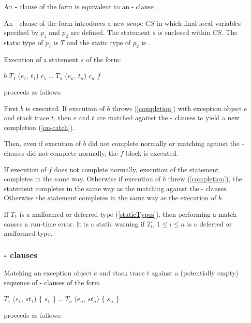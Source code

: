 \documentclass{article}
\begin{document}
An \ON{}-\CATCH{} clause of the form  is equivalent to an \ON{}-\CATCH{} clause .

\LMHash{}
An \ON{}-\CATCH{} clause of the form  introduces a new scope $CS$ in which final local variables specified by $p_1$ and $p_2$ are defined.
The statement $s$ is enclosed within $CS$.
The static type of $p_1$ is $T$ and the static type of $p_2$ is .

\LMHash{}
Execution of a \TRY{} statement $s$ of the form:
\begin{dartCode}
\TRY{} $b$
\ON{} $T_1$ \CATCH{} ($e_1$, $t_1$) $c_1$
\ldots{}
\ON{} $T_n$ \CATCH{} ($e_n$, $t_n$) $c_n$
\FINALLY{} $f$
\end{dartCode}
proceeds as follows:

\LMHash{}
First $b$ is executed.
If execution of $b$ throws (\ref{completion}) with exception object $e$ and stack trace $t$, then $e$ and $t$ are matched against the \ON{}-\CATCH{} clauses to yield a new completion (\ref{on-catch}).

Then, even if execution of $b$ did not complete normally or matching against the \ON{}-\CATCH{} clauses did not complete normally, the $f$ block is executed.

If execution of $f$ does not complete normally,
execution of the \TRY{} statement completes in the same way.
Otherwise if execution of $b$ threw (\ref{completion}), the \TRY{} statement completes in the same way as the matching against the \ON{}-\CATCH{} clauses.
Otherwise the \TRY{} statement completes in the same way as the execution of $b$.

\LMHash{}
If $T_1$ is a malformed or deferred type (\ref{staticTypes}), then performing a match causes a run-time error.
It is a static warning if $T_i$, $1 \le i \le n$ is a deferred or malformed type.


\subsubsection{\ON{}-\CATCH{} clauses}

\LMHash{}
Matching an exception object $e$ and stack trace $t$ against a (potentially empty) sequence of \ON{}-\CATCH{} clauses of the form
\begin{dartCode}
\ON{} $T_1$ \CATCH{} ($e_1$, $st_1$) \{ $s_1$ \}
\ldots
\ON{} $T_n$ \CATCH{} ($e_n$, $st_n$) \{ $s_n$ \}
\end{dartCode}
proceeds as follows:
\end{document}
